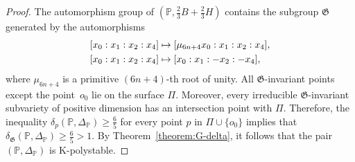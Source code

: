\documentclass[12pt]{amsart}
\theoremstyle{definition}
\theoremstyle{remark}
\begin{document}
\begin{proof}
The automorphism group of $(\mathbb{P}, \frac{2}{3}B+\frac{2}{3}H)$ contains the subgroup $\mathfrak{G}$ generated by the  automorphisms
\[\aligned
&[x_0:x_1:x_2:x_4]\mapsto [\mu_{6n+4}x_0:x_1: x_2: x_4],\\
&[x_0:x_1:x_2:x_4]\mapsto [x_0:x_1:-x_2: - x_4],\\
\endaligned
\]
where $\mu_{6n+4}$ is a primitive $(6n+4)$-th root of unity.
All  $\mathfrak{G}$-invariant points except the point~$o_0$ lie on the surface $\Pi$.
Moreover, every irreducible $\mathfrak{G}$-invariant subvariety  of  positive dimension has an intersection point with $\Pi$. Therefore, the inequality $\delta_p\left(\mathbb{P}, \Delta_\mathbb{P}\right)\geq\frac{6}{5}$ for every point $p$ in $\Pi\cup\{o_0\}$ implies that
$\delta_{\mathfrak{G}}(\mathbb{P}, \Delta_\mathbb{P})\geq \frac{6}{5}>1$.
By Theorem~\ref{theorem:G-delta}, it follows that
the pair $(\mathbb{P},\Delta_\mathbb{P})$ is K-polystable. \end{proof}
\end{document}
